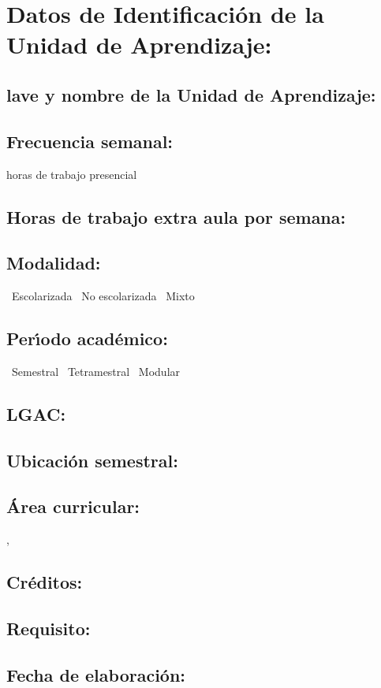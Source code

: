 \documentclass[10 pt]{article}
\begin{document}


\section{Datos de Identificaci\'{o}n de la Unidad de Aprendizaje:}
\subsection{lave y nombre de la Unidad de Aprendizaje:} 
\subsection{Frecuencia semanal:} horas de trabajo presencial 
\subsection{Horas de trabajo extra aula por semana:} 
\subsection{Modalidad:} \yes~Escolarizada \no~No escolarizada \no~Mixto
\subsection{Per\'{\i}odo acad\'{e}mico:} \yes~Semestral
\no~Tetramestral \no~Modular
\subsection{LGAC:} \underline{\seys}
\subsection{Ubicaci\'{o}n semestral:} 
\subsection{\'{A}rea curricular:} \underline{\fr, \le}
\subsection{Cr\'{e}ditos:} 
\subsection{Requisito:} 
\subsection{Fecha de elaboraci\'{o}n:} 
\end{document}
